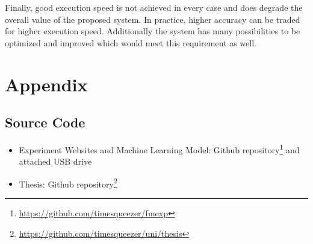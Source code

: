 \documentclass[
    fontsize=12pt,
    headings=small,
    parskip=half,           %
    bibliography=totoc,
    numbers=noenddot,       %
    open=any,               %
    final                   %
]{scrreprt}
\begin{document}
Finally, good execution speed is not achieved in every case and does degrade the overall value of the proposed system. In practice, higher accuracy can be traded for higher execution speed. Additionally the system has many possibilities to be optimized and improved which would meet this requirement as well.

\begin{raggedright}
  \printbibliography
\end{raggedright}

\chapter*{Appendix}

\section*{Source Code}

\begin{itemize}
	\item Experiment Websites and Machine Learning Model: Github repository\footnote{\url{https://github.com/timesqueezer/fmexp}} and attached USB drive
	\item Thesis: Github repository\footnote{\url{https://github.com/timesqueezer/uni/thesis}}
\end{itemize}
\end{document}
